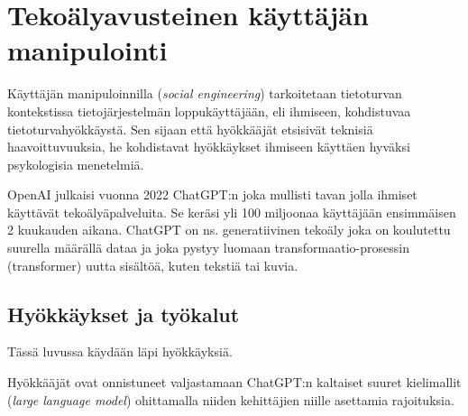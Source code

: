 


\chapter*{Tekoälyavusteinen käyttäjän\\manipulointi\label{chapter:finnish}}
\begin{comment}

Tekoälyä hyödyntävä käyttäjän manipulointi
Teokälypohjainen käyttäjän manipulointi
Tekoälyavusteinen käyttäjän manipulointi

Pyydä Riinalta ym palautetta kieliopin tarkistuksessa! Opin samalla itse. Riinahan voi tarkistaa esim tätä .tex tiedostoa GitHubista? Tai PDF kumpi vaan hänelle parempi, mutta PDF:n kassa pitää muistaa aina päivittää se Overleafiin ja sitten GitHubiin.

Ohjeet:
    - 4 or 5 sivua
    - TOC ja Chapter 1 Introduction väliin

Kappaleet:
    - (ilman nimeä sisältää Introduction ja Definition kappaleet)
    - Hyökkäykset ja työkalut
    - Puolustuskeinot
    - Puolustuskeinojen arviointia
    - Yhteenveto
    - EI Overleaf kappalenumerointia? Kappale "0"?
    

\end{comment}


Käyttäjän manipuloinnilla (\textit{social engineering}) tarkoitetaan tietoturvan kontekstissa tietojärjestelmän loppukäyttäjään, eli ihmiseen, kohdistuvaa tietoturvahyökkäystä. Sen sijaan että hyökkääjät etsisivät teknisiä haavoittuvuuksia, he kohdistavat hyökkäykset ihmiseen käyttäen hyväksi psykologisia menetelmiä.

OpenAI julkaisi vuonna 2022 ChatGPT:n joka mullisti tavan jolla ihmiset käyttävät tekoälyäpalveluita. Se keräsi yli 100 miljoonaa käyttäjään ensimmäisen 2 kuukauden aikana. ChatGPT on ns. generatiivinen tekoäly joka on koulutettu suurella määrällä dataa ja joka pystyy luomaan transformaatio-prosessin (transformer) uutta sisältöä, kuten tekstiä tai kuvia.

\section*{Hyökkäykset ja työkalut}

Tässä luvussa käydään läpi hyökkäyksiä.

Hyökkääjät ovat onnistuneet valjastamaan ChatGPT:n kaltaiset suuret kielimallit (\textit{large language model}) ohittamalla niiden kehittäjien niille asettamia rajoituksia.

